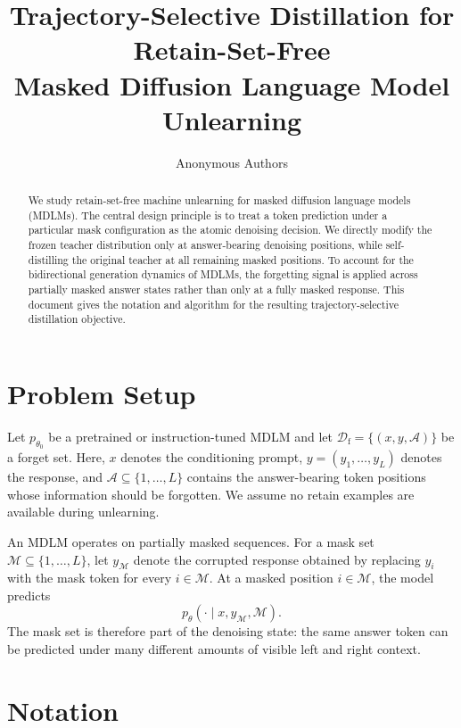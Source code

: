 \documentclass{article}
\title{Trajectory-Selective Distillation for Retain-Set-Free\\
Masked Diffusion Language Model Unlearning}
\author{Anonymous Authors}
\newcommand{\Df}{\mathcal{D}_{\mathrm f}}
\newcommand{\Mset}{\mathcal{M}}
\newcommand{\Aset}{\mathcal{A}}
\begin{document}
\maketitle

\begin{abstract}
We study retain-set-free machine unlearning for masked diffusion language models
(MDLMs). The central design principle is to treat a token prediction under a
particular mask configuration as the atomic denoising decision. We directly
modify the frozen teacher distribution only at answer-bearing denoising
positions, while self-distilling the original teacher at all remaining masked
positions. To account for the bidirectional generation dynamics of MDLMs, the
forgetting signal is applied across partially masked answer states rather than
only at a fully masked response. This document gives the notation and algorithm
for the resulting trajectory-selective distillation objective.
\end{abstract}

\section{Problem Setup}
Let $p_{\theta_0}$ be a pretrained or instruction-tuned MDLM and let
$\Df=\{(x,y,\Aset)\}$ be a forget set. Here, $x$ denotes the conditioning
prompt, $y=(y_1,\ldots,y_L)$ denotes the response, and
$\Aset\subseteq\{1,\ldots,L\}$ contains the answer-bearing token positions
whose information should be forgotten. We assume no retain examples are
available during unlearning.

An MDLM operates on partially masked sequences. For a mask set
$\Mset\subseteq\{1,\ldots,L\}$, let $y_{\Mset}$ denote the corrupted response
obtained by replacing $y_i$ with the mask token for every $i\in\Mset$. At a
masked position $i\in\Mset$, the model predicts
\begin{equation}
    p_{\theta}(\cdot\mid x,y_{\Mset},\Mset).
\end{equation}
The mask set is therefore part of the denoising state: the same answer token can
be predicted under many different amounts of visible left and right context.

\section{Notation}
\end{document}
